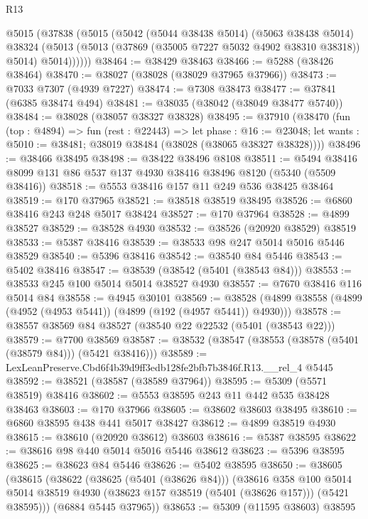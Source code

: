 \begin{lexlean}{R13}
\begin{coremodule}
      @5015
        (@37838
          (@5015
            (@5042
              (@5044 @38438 @5014)
              (@5063 @38438 @5014)
              @38324
              (@5013 (@5013 (@37869 (@35005 @7227 @5032 @4902 @38310 @38318)) @5014) @5014))))))
@38464 := @38429 @38463
@38466 := @5288 (@38426 @38464)
@38470 := @38027 (@38028 (@38029 @37965 @37966))
@38473 := @7033 @7307 (@4939 @7227)
@38474 := @7308 @38473
@38477 := @37841 (@6385 @38474 @494)
@38481 := @38035 (@38042 (@38049 @38477 @5740))
@38484 := @38028 (@38057 @38327 @38328)
@38495 := @37910
    (@38470
      (fun (top : @4894) =>
      fun (rest : @22443) =>
      let phase : @16 := @23048;
      let wants : @5010 := @38481; @38019 @38484 (@38028 (@38065 @38327 @38328))))
@38496 := @38466 @38495
@38498 := @38422 @38496 @8108
@38511 := @5494 @38416 @8099 @131 @86 @537 @137 @4930 @38416 @38496 @8120 (@5340 (@5509 @38416))
@38518 := @5553 @38416 @157 @11 @249 @536 @38425 @38464
@38519 := @170 @37965
@38521 := @38518 @38519 @38495
@38526 := @6860 @38416 @243 @248 @5017 @38424
@38527 := @170 @37964
@38528 := @4899 @38527
@38529 := @38528 @4930
@38532 := @38526 (@20920 @38529) @38519
@38533 := @5387 @38416
@38539 := @38533 @98 @247 @5014 @5016 @5446 @38529
@38540 := @5396 @38416
@38542 := @38540 @84 @5446
@38543 := @5402 @38416
@38547 := @38539 (@38542 (@5401 (@38543 @84)))
@38553 := @38533 @245 @100 @5014 @5014 @38527 @4930
@38557 := @7670 @38416 @116 @5014 @84
@38558 := @4945 @30101
@38569 := @38528 (@4899 @38558 (@4899 (@4952 (@4953 @5441)) (@4899 (@192 (@4957 @5441)) @4930)))
@38578 := @38557 @38569 @84 @38527 (@38540 @22 @22532 (@5401 (@38543 @22)))
@38579 := @7700 @38569
@38587 := @38532 (@38547 (@38553 (@38578 (@5401 (@38579 @84))) (@5421 @38416)))
@38589 := LexLeanPreserve.Cbd6f4b39d9ff3edb128fe2bfb7b3846f.R13.__rel_4 @5445
@38592 := @38521 (@38587 (@38589 @37964))
@38595 := @5309 (@5571 @38519) @38416
@38602 := @5553 @38595 @243 @11 @442 @535 @38428 @38463
@38603 := @170 @37966
@38605 := @38602 @38603 @38495
@38610 := @6860 @38595 @438 @441 @5017 @38427
@38612 := @4899 @38519 @4930
@38615 := @38610 (@20920 @38612) @38603
@38616 := @5387 @38595
@38622 := @38616 @98 @440 @5014 @5016 @5446 @38612
@38623 := @5396 @38595
@38625 := @38623 @84 @5446
@38626 := @5402 @38595
@38650 := @38605
    (@38615
      (@38622
        (@38625 (@5401 (@38626 @84)))
        (@38616
          @358
          @100
          @5014
          @5014
          @38519
          @4930
          (@38623 @157 @38519 (@5401 (@38626 @157)))
          (@5421 @38595)))
      (@6884 @5445 @37965))
@38653 := @5309 (@11595 @38603) @38595

\end{coremodule}
\end{lexlean}
